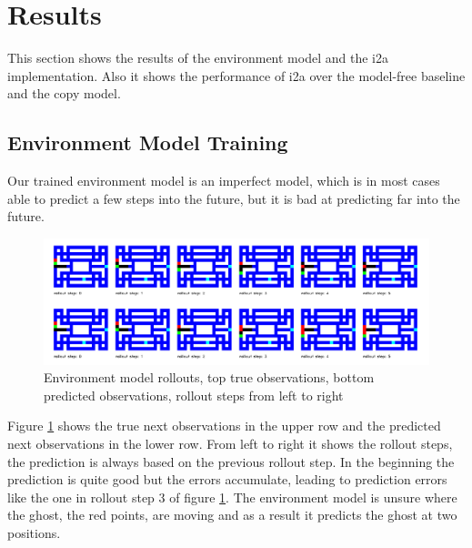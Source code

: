 \section{Results}

This section shows the results of the environment model and the i2a implementation. Also it shows the performance of i2a over the model-free baseline and the copy model.


\subsection{Environment Model Training}

Our trained environment model is an imperfect model, which is in most cases able to predict a few steps into the future, but it is bad at predicting far into the future.\\


\begin{figure}[H] 
  \centering   
  \includegraphics[width=\columnwidth]{./Images/env_model_rollouts.png}
  \caption{Environment model rollouts, top true observations, bottom predicted observations, rollout steps from left to right} 
  \label{fig:environment_model_rollouts} 
\end{figure} 


Figure \ref{fig:environment_model_rollouts} shows the true next observations in the upper row and the predicted next observations in the lower row. From left to right it shows the rollout steps, the prediction is always based on the previous rollout step. In the beginning the prediction is quite good but the errors accumulate, leading to prediction errors like the one in rollout step 3 of figure \ref{fig:environment_model_rollouts}. The environment model is unsure where the ghost, the red points, are moving and as a result it predicts the ghost at two positions.\\


